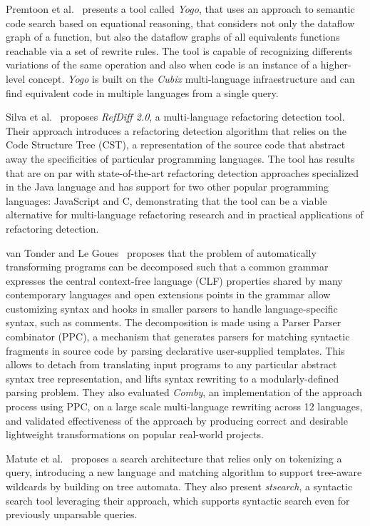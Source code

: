 Premtoon et al.~\cite{premtoon2020-code-search-equational-reasoning} presents 
a tool called \textit{Yogo}, that uses an approach to semantic code search 
based on equational reasoning, that considers not only the dataflow graph of 
a function, but also the dataflow graphs of all equivalents functions reachable 
via a set of rewrite rules. The tool is capable of recognizing differents 
variations of the same operation and also when code is an instance of a 
higher-level concept.
\textit{Yogo} is built on the \textit{Cubix} multi-language infraestructure and 
can find equivalent code in multiple languages from a single query.

Silva et al.~\cite{silva2021-refdiff} proposes \textit{RefDiff 2.0}, a 
multi-language refactoring detection tool. Their approach introduces a 
refactoring detection algorithm that relies on the Code Structure Tree 
(CST), a representation of the source code that abstract away the 
specificities of particular programming languages. 
The tool has results that are on par with state-of-the-art refactoring 
detection approaches specialized in the Java language and has support 
for two other popular programming languages: JavaScript and C,
demonstrating that the tool can be a viable alternative for multi-language
refactoring research and in practical applications of refactoring detection.

van Tonder and Le Goues~\cite{vanTonder2019-syntax-transformation-ppc} proposes
that the problem of automatically transforming programs can be decomposed such
that a common grammar expresses the central context-free language (CLF) 
properties shared by many contemporary languages and open extensions points
in the grammar allow customizing syntax and hooks in smaller parsers to handle
language-specific syntax, such as comments. The decomposition is made using a
Parser Parser combinator (PPC), a mechanism that generates parsers for matching
syntactic fragments in source code by parsing declarative user-supplied 
templates. 
This allows to detach from translating input programs to any particular 
abstract syntax tree representation, and lifts syntax rewriting to a 
modularly-defined parsing problem. 
They also evaluated \textit{Comby}, an implementation of the approach process 
using PPC, on a large scale multi-language rewriting across 12 languages, and 
validated effectiveness of the approach by producing correct and desirable 
lightweight transformations on popular real-world projects.

Matute et al.~\cite{matute2024-sequence-tree-matching} proposes a search
architecture that relies only on tokenizing a query, introducing a new 
language and matching algorithm to support tree-aware wildcards by building
on tree automata. They also present \textit{stsearch}, a syntactic search
tool leveraging their approach, which supports syntactic search even for
previously unparsable queries.

